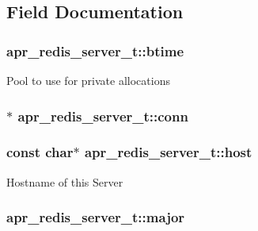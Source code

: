 \subsection{Field Documentation}
\subsubsection[{\texorpdfstring{btime}{btime}}]{ apr\+\_\+redis\+\_\+server\+\_\+t\+::btime}\hypertarget{structapr__redis__server__t_a539d098b8653f4ab7aaa240aa22f0529}{}\label{structapr__redis__server__t_a539d098b8653f4ab7aaa240aa22f0529}
Pool to use for private allocations 
\subsubsection[{\texorpdfstring{conn}{conn}}]{$\ast$ apr\+\_\+redis\+\_\+server\+\_\+t\+::conn}\hypertarget{structapr__redis__server__t_ac7c573f21a6ea3be51afdc8a7e99eb9b}{}\label{structapr__redis__server__t_ac7c573f21a6ea3be51afdc8a7e99eb9b}
\subsubsection[{\texorpdfstring{host}{host}}]{\setlength{\rightskip}{0pt plus 5cm}const char$\ast$ apr\+\_\+redis\+\_\+server\+\_\+t\+::host}\hypertarget{structapr__redis__server__t_aa32b3c8c259dbfbeb884f477f89a19e0}{}\label{structapr__redis__server__t_aa32b3c8c259dbfbeb884f477f89a19e0}
Hostname of this Server 
\subsubsection[{\texorpdfstring{major}{major}}]{ apr\+\_\+redis\+\_\+server\+\_\+t\+::major}\hypertarget{structapr__redis__server__t_a67438d233c04367c487283aa65881f50}{}\label{structapr__redis__server__t_a67438d233c04367c487283aa65881f50}
